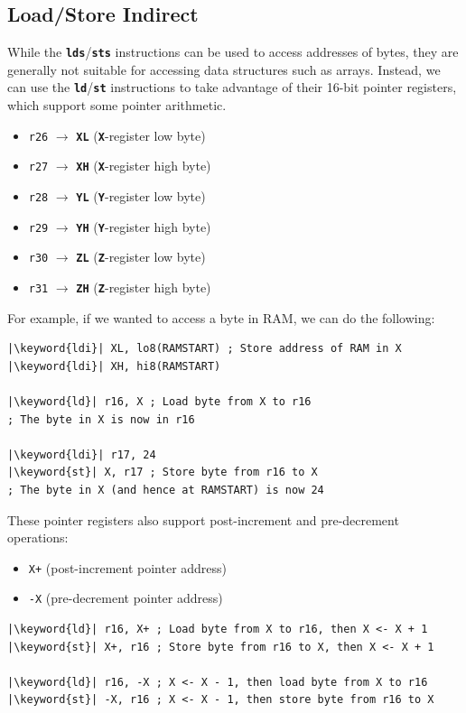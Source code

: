 \documentclass{report}
\newcommand{\keyword}[1]{\textcolor[rgb]{0.00,0.50,0.00}{\textbf{#1}}}
\newcommand{\keywordinline}[1]{\textcolor[rgb]{0.00,0.50,0.00}{\textbf{\texttt{#1}}}}
\begin{document}
\subsection{Load/Store Indirect}
While the \keywordinline{lds}/\keywordinline{sts} instructions can be used to access addresses
of bytes, they are generally not suitable for accessing data structures such as arrays.
Instead, we can use the \keywordinline{ld}/\keywordinline{st} instructions to
take advantage of their 16-bit pointer registers, which support some pointer arithmetic.
\begin{itemize}
    \item \texttt{r26} \(\to\) \keywordinline{XL} (\keywordinline{X}-register low byte)
    \item \texttt{r27} \(\to\) \keywordinline{XH} (\keywordinline{X}-register high byte)
    \item \texttt{r28} \(\to\) \keywordinline{YL} (\keywordinline{Y}-register low byte)
    \item \texttt{r29} \(\to\) \keywordinline{YH} (\keywordinline{Y}-register high byte)
    \item \texttt{r30} \(\to\) \keywordinline{ZL} (\keywordinline{Z}-register low byte)
    \item \texttt{r31} \(\to\) \keywordinline{ZH} (\keywordinline{Z}-register high byte)
\end{itemize}
For example, if we wanted to access a byte in RAM, we can do the following:
\begin{verbatim}
|\keyword{ldi}| XL, lo8(RAMSTART) ; Store address of RAM in X
|\keyword{ldi}| XH, hi8(RAMSTART)

|\keyword{ld}| r16, X ; Load byte from X to r16
; The byte in X is now in r16

|\keyword{ldi}| r17, 24
|\keyword{st}| X, r17 ; Store byte from r16 to X
; The byte in X (and hence at RAMSTART) is now 24
\end{verbatim}
These pointer registers also support post-increment and pre-decrement operations:
\begin{itemize}
    \item \texttt{X+} (post-increment pointer address)
    \item \texttt{-X} (pre-decrement pointer address)
\end{itemize}
\begin{verbatim}
|\keyword{ld}| r16, X+ ; Load byte from X to r16, then X <- X + 1
|\keyword{st}| X+, r16 ; Store byte from r16 to X, then X <- X + 1

|\keyword{ld}| r16, -X ; X <- X - 1, then load byte from X to r16
|\keyword{st}| -X, r16 ; X <- X - 1, then store byte from r16 to X
\end{verbatim}
\end{document}
